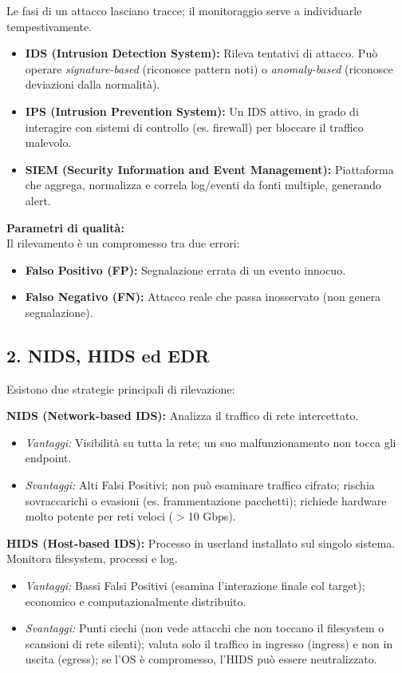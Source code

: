 \documentclass[12pt, a4paper]{report}
\begin{document}
Le fasi di un attacco lasciano tracce; il monitoraggio serve a individuarle tempestivamente.

\begin{itemize}
	\item \textbf{IDS (Intrusion Detection System):} Rileva tentativi di attacco. Può operare \textit{signature-based} (riconosce pattern noti) o \textit{anomaly-based} (riconosce deviazioni dalla normalità).
	\item \textbf{IPS (Intrusion Prevention System):} Un IDS attivo, in grado di interagire con sistemi di controllo (es. firewall) per bloccare il traffico malevolo.
	\item \textbf{SIEM (Security Information and Event Management):} Piattaforma che aggrega, normalizza e correla log/eventi da fonti multiple, generando alert.
\end{itemize}

\textbf{Parametri di qualità:}\\
Il rilevamento è un compromesso tra due errori:
\begin{itemize}
	\item \textbf{Falso Positivo (FP):} Segnalazione errata di un evento innocuo.
	\item \textbf{Falso Negativo (FN):} Attacco reale che passa inosservato (non genera segnalazione).
\end{itemize}

\subsection{2. NIDS, HIDS ed EDR}

Esistono due strategie principali di rilevazione:

\textbf{NIDS (Network-based IDS):} Analizza il traffico di rete intercettato.
\begin{itemize}
	\item \textit{Vantaggi:} Visibilità su tutta la rete; un suo malfunzionamento non tocca gli endpoint.
	\item \textit{Svantaggi:} Alti Falsi Positivi; non può esaminare traffico cifrato; rischia sovraccarichi o evasioni (es. frammentazione pacchetti); richiede hardware molto potente per reti veloci ($>$10 Gbps).
\end{itemize}

\textbf{HIDS (Host-based IDS):} Processo in userland installato sul singolo sistema. Monitora filesystem, processi e log.
\begin{itemize}
	\item \textit{Vantaggi:} Bassi Falsi Positivi (esamina l'interazione finale col target); economico e computazionalmente distribuito.
	\item \textit{Svantaggi:} Punti ciechi (non vede attacchi che non toccano il filesystem o scansioni di rete silenti); valuta solo il traffico in ingresso (ingress) e non in uscita (egress); se l'OS è compromesso, l'HIDS può essere neutralizzato.
\end{itemize}
\end{document}
